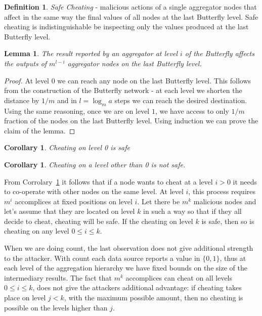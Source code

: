 \documentclass[11pt,twocolumn]{MyTightStyle}
\theoremstyle{plain}
\newtheorem{cor}[thm]{Corollary}
\newtheorem{lem}[thm]{Lemma}
\theoremstyle{definition}
\newtheorem{defn}{Definition}%
\theoremstyle{remark}
\numberwithin{equation}{section}
\begin{document}
\begin{defn}
{\it Safe Cheating} - malicious actions of a single aggregator nodes
that affect in the same way the final values of all nodes at the
last Butterfly level. Safe cheating is indistinguishable be inspecting
only the values produced at the last Butterfly level.
\end{defn}

\begin{lem}
The result reported by an aggregator at level $i$ of the Butterfly
affects the outputs of $m^{l-i}$ aggregator nodes on the last
Butterfly level.
\end{lem}

\begin{proof}
At level $0$ we can reach any node on the last Butterfly level. This
follows from the construction of the Butterfly network - at each level
we shorten the distance by $1/m$ and in $l = \log_m{a}$ steps we can
reach the desired destination. Using the same reasoning, once we
are on level $1$, we have access to only $1/m$ fraction of the nodes
on the last Butterfly level. Using induction we can prove the claim of
the lemma.
\end{proof}

\begin{cor}
Cheating on level 0 is safe
\end{cor}


\begin{cor}\label{cor:no_safe}
Cheating on a level other than 0 is not safe.
\end{cor}

From Corrolary~\ref{cor:no_safe} it follows that if a node wants to
cheat at a level $i > 0$ it needs to co-operate with other nodes on
the same level. At level $i$, this process requires $m^i$ accomplices
at fixed positions on level $i$. Let there be $m^k$ malicious nodes
and let's assume that they are located on level $k$ in such a way so
that if they all decide to cheat, cheating will be safe. If the
cheating on level $k$ is safe, then so is cheating on any level $0 \leq i \leq k$.

When we are doing count, the last observation does not give additional
strength to the attacker. With count each data source reports a value
in $\{0, 1\}$, thus at each level of the aggregation hierarchy we have
fixed bounds on the size of the intermediary results. The fact that
$m^k$ accomplices can cheat on all levels $0 \leq i \leq k$, does  not
give the attackers additional advantage: if cheating takes place on
level $j < k$, with the maximum possible amount, then no cheating is
possible on the levels higher than $j$.   
\end{document}
